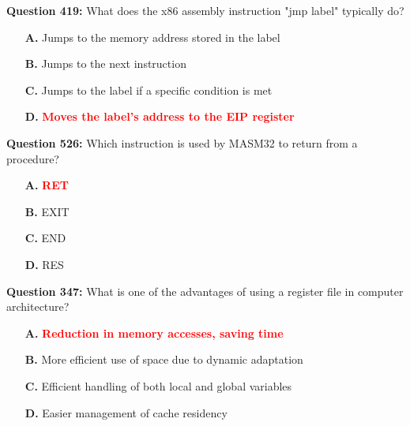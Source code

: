 \documentclass[12pt,a4paper]{article}
\begin{document}
\vspace{0.5cm}

\textbf{Question 419:} What does the x86 assembly instruction "jmp label" typically do?

\begin{itemize}
    \item[\textbf{A.}] Jumps to the memory address stored in the label
    \item[\textbf{B.}] Jumps to the next instruction
    \item[\textbf{C.}] Jumps to the label if a specific condition is met
    \item[\textbf{D.}] \textcolor{red}{\textbf{Moves the label's address to the EIP register}}
\end{itemize}

\vspace{0.5cm}

\vspace{0.5cm}

\textbf{Question 526:} Which instruction is used by MASM32 to return from a procedure?

\begin{itemize}
    \item[\textbf{A.}] \textcolor{red}{\textbf{RET}}
    \item[\textbf{B.}] EXIT
    \item[\textbf{C.}] END
    \item[\textbf{D.}] RES
\end{itemize}

\vspace{0.5cm}

\vspace{0.5cm}

\textbf{Question 347:} What is one of the advantages of using a register file in computer architecture?

\begin{itemize}
    \item[\textbf{A.}] \textcolor{red}{\textbf{Reduction in memory accesses, saving time}}
    \item[\textbf{B.}] More efficient use of space due to dynamic adaptation
    \item[\textbf{C.}] Efficient handling of both local and global variables
    \item[\textbf{D.}] Easier management of cache residency
\end{itemize}

\vspace{0.5cm}
\end{document}
